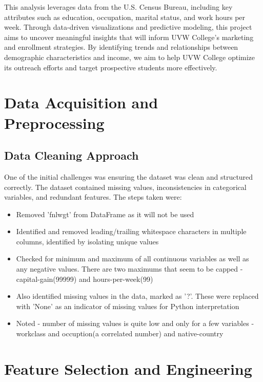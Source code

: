 \documentclass[journal]{IEEEtran}
\begin{document}
This analysis leverages data from the U.S. Census Bureau, including key attributes
such as education, occupation, marital status, and work hours per week. Through
data-driven visualizations and predictive modeling, this project aims to uncover
meaningful insights that will inform UVW College’s marketing and enrollment strategies.
By identifying trends and relationships between demographic characteristics and income,
we aim to help UVW College optimize its outreach efforts and target prospective
students more effectively.



\section{Data Acquisition and Preprocessing}


\subsection{Data Cleaning Approach}
One of the initial challenges was ensuring the dataset was clean and structured correctly. The dataset contained missing values, inconsistencies in categorical variables, and redundant features. The steps taken were:
\begin{itemize}
    \item Removed 'fnlwgt' from DataFrame as it will not be used
    \item Identified and removed leading/trailing whitespace characters in multiple columns, identified by isolating unique values
    \item Checked for minimum and maximum of all continuous variables as well as any negative values. There are two maximums that seem to be capped - capital-gain(99999) and hours-per-week(99)
    \item Also identified missing values in the data, marked as '?'. These were replaced with 'None' as an indicator of missing values for Python interpretation
    \item Noted - number of missing values is quite low and only for a few variables - workclass and occuption(a correlated number) and native-country
\end{itemize}

\section{Feature Selection and Engineering}
\end{document}
